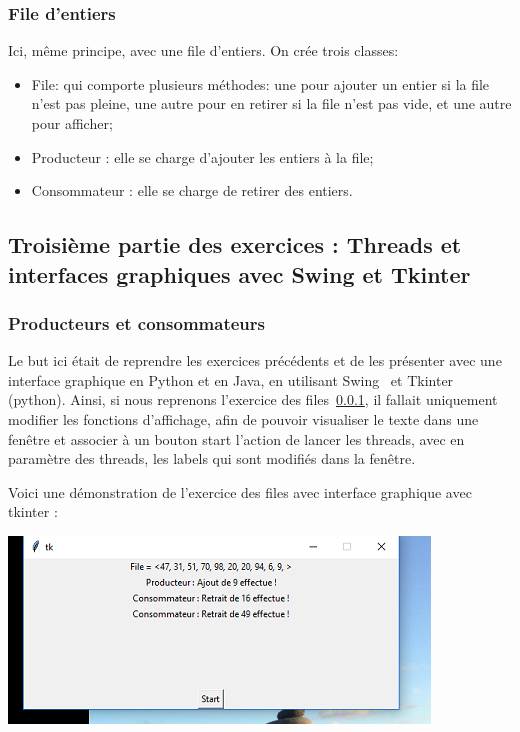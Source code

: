 \documentclass{article}
\begin{document}
\subsubsection{File d'entiers}
\label{section : file}

Ici, même principe, avec une file d'entiers. On crée trois classes:
\begin{itemize}
\item File: qui comporte plusieurs méthodes: une pour ajouter un entier si la file n'est pas pleine, une autre pour en retirer si la file n'est pas vide, et une autre pour afficher;
\item Producteur : elle se charge d'ajouter les entiers à la file;
\item Consommateur : elle se charge de retirer des entiers.
\end{itemize}

\subsection{Troisième partie des exercices : Threads et interfaces graphiques avec Swing et Tkinter}
\label{section : interfaces}

\subsubsection{Producteurs et consommateurs}
\label{section : prodcons}

Le but ici était de reprendre les exercices précédents et de les présenter avec une interface graphique en Python et en Java, en utilisant Swing~\cite{swingDoc} et Tkinter~\cite{tkinterDoc} (python). 
Ainsi, si nous reprenons l'exercice des files~\ref{section : file}, il fallait uniquement modifier les fonctions d'affichage, afin de pouvoir visualiser le texte dans une fenêtre et associer à un bouton start l'action de lancer les threads, avec en paramètre des threads, les labels qui sont modifiés dans la fenêtre.

Voici une démonstration de l'exercice des files avec interface graphique avec tkinter :
\begin{center}
\includegraphics{ex3_1.png}
\end{center}
\end{document}
